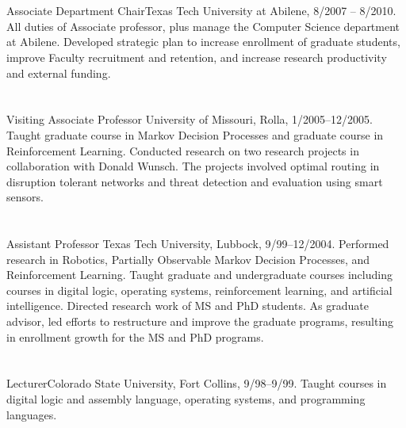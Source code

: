 \documentclass[12pt,letter]{resume}
\begin{document}
\section{}
{Associate Department Chair}{Texas Tech University at Abilene, 8/2007 --
8/2010.  All duties of Associate professor, plus manage the Computer
Science department at Abilene.
Developed strategic plan to increase enrollment of graduate students,
improve Faculty recruitment and retention, and increase research productivity
and external funding.}

\section{}
{Visiting Associate Professor} {University of Missouri, Rolla,
1/2005--12/2005. Taught graduate course in Markov Decision Processes and
graduate course in Reinforcement Learning.  Conducted research on two
research projects in collaboration with Donald Wunsch.  The projects
involved optimal routing in disruption tolerant networks and threat detection
and evaluation using smart sensors.   }

\section{}
{Assistant Professor} {Texas Tech University, Lubbock,
9/99--12/2004.  
Performed research in Robotics, Partially
Observable Markov Decision Processes, and Reinforcement Learning.  Taught
graduate and undergraduate courses including courses in digital logic,
operating systems, reinforcement learning, and artificial intelligence.
Directed research work of MS and PhD students.
As graduate advisor, led efforts to restructure and improve
the graduate programs, resulting in enrollment growth for
the MS and PhD programs.}

\section{}
{Lecturer}{Colorado State University,
  Fort Collins, 9/98--9/99. Taught courses in digital
  logic and assembly language, operating systems, and programming
  languages.}
\end{document}
